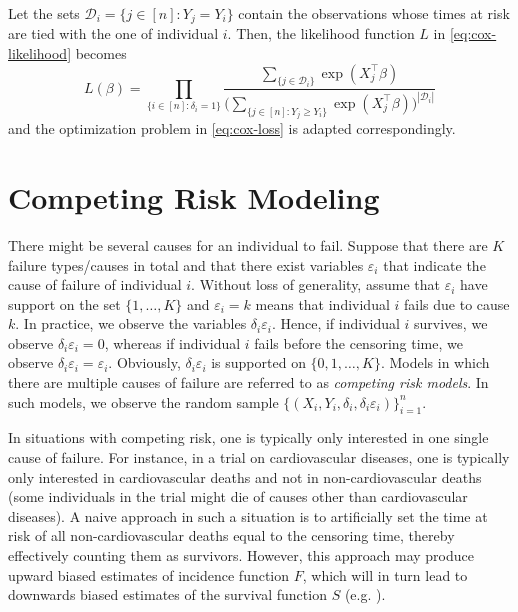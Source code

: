 \documentclass[11pt]{article}
\begin{document}
Let the sets $\mathcal{D}_i = \{ j \in [n] : Y_j = Y_i \}$ contain the observations whose times at risk are tied with the one of individual $i$. Then, the likelihood function $L$ in \eqref{eq:cox-likelihood} becomes
\begin{equation*} 
        L(\beta)
        =
        \prod_{\{ i \in [n] : \delta_i = 1 \}}
        \frac{ \sum_{\{j\in \mathcal{D}_i\}}\exp(X_j^\top \beta) }{ \Big( \sum_{\{ j\in[n] : Y_j \geq Y_i \}} \exp(X_j^\top \beta) \Big)^{|\mathcal{D}_i|} }
\end{equation*}
and the optimization problem in \eqref{eq:cox-loss} is adapted correspondingly.

\section{Competing Risk Modeling}
There might be several causes for an individual to fail. Suppose that there are $K$ failure types/causes in total and that there exist variables $\varepsilon_i$ that indicate the cause of failure of individual $i$. Without loss of generality, assume that $\varepsilon_i$ have support on the set $\{1,\dots,K\}$ and $\varepsilon_i = k$ means that individual $i$ fails due to cause $k$. In practice, we observe the variables $\delta_i\varepsilon_i$. Hence, if individual $i$ survives, we observe $\delta_i\varepsilon_i = 0$, whereas if individual $i$ fails before the censoring time, we observe $\delta_i\varepsilon_i =\varepsilon_i$. Obviously, $\delta_i\varepsilon_i$ is supported on $\{0,1,\dots,K\}$. Models in which there are multiple causes of failure are referred to as \textit{competing risk models}. In such models, we observe the random sample $\{ (X_i, Y_i, \delta_i, \delta_i\varepsilon_i) \}_{i=1}^n$.

In situations with competing risk, one is typically only interested in one single cause of failure. For instance, in a trial on cardiovascular diseases, one is typically only interested in cardiovascular deaths and not in non-cardiovascular deaths (some individuals in the trial might die of causes other than cardiovascular diseases). A naive approach in such a situation is to artificially set the time at risk of all non-cardiovascular deaths equal to the censoring time, thereby effectively counting them as survivors. However, this approach may produce upward biased estimates of incidence function $F$, which will in turn lead to downwards biased estimates of the survival function $S$ (e.g. \citealp{austin2016introduction}). 
\end{document}
